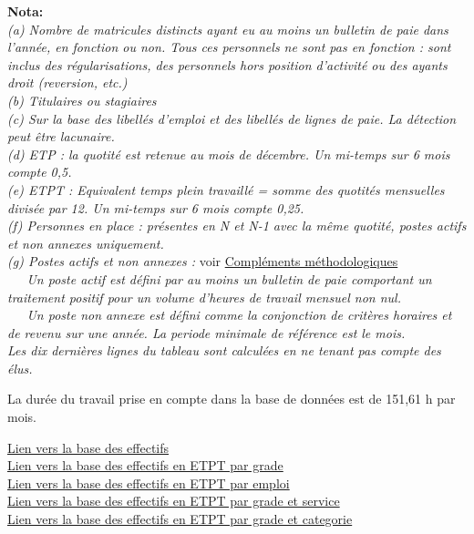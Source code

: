 \textbf{Nota:}\\
\emph{(a) Nombre de matricules distincts ayant eu au moins un bulletin
de paie dans l'année, en fonction ou non. Tous ces personnels ne sont
pas en fonction : sont inclus des régularisations, des personnels hors
position d'activité ou des ayants droit (reversion, etc.)}\\
\emph{(b) Titulaires ou stagiaires}\\
\emph{(c) Sur la base des libellés d'emploi et des libellés de lignes de
paie. La détection peut être lacunaire.}\\
\emph{(d) ETP : la quotité est retenue au mois de décembre. Un mi-temps
sur 6 mois compte 0,5.}\\
\emph{(e) ETPT : Equivalent temps plein travaillé = somme des quotités
mensuelles divisée par 12. Un mi-temps sur 6 mois compte 0,25.}\\
\emph{(f) Personnes en place : présentes en N et N-1 avec la même
quotité, postes actifs et non annexes uniquement.}\\
\emph{(g) Postes actifs et non annexes :} voir
\href{../Docs/méthodologie.pdf}{Compléments méthodologiques}\\
\emph{~~~Un poste actif est défini par au moins un bulletin de paie
comportant un traitement positif pour un volume d'heures de travail
mensuel non nul.}\\
\emph{~~~Un poste non annexe est défini comme la conjonction de critères
horaires et de revenu sur une année. La periode minimale de référence
est le mois.}\\
\emph{Les dix dernières lignes du tableau sont calculées en ne tenant
pas compte des élus.}

La durée du travail prise en compte dans la base de données est de
151,61 h par mois.

\href{../Bases/Effectifs/tableau.effectifs.csv}{Lien vers la base des
effectifs}\\
\href{../Bases/Effectifs/tableau.effectifs.grades.csv}{Lien vers la base
des effectifs en ETPT par grade}\\
\href{../Bases/Effectifs/tableau.effectifs.emplois.csv}{Lien vers la base
des effectifs en ETPT par emploi}\\
\href{../Bases/Effectifs/tableau.effectifs.services.zip}{Lien vers la base
des effectifs en ETPT par grade et service}\\
\href{../Bases/Effectifs/tableau.effectifs.categories.zip}{Lien vers la
base des effectifs en ETPT par grade et categorie}

